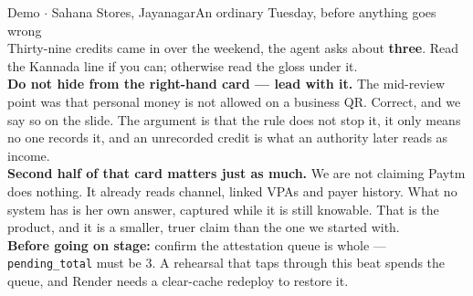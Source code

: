 \documentclass[aspectratio=169,10pt]{beamer}
\begin{document}
\begin{frame}{Demo $\cdot$ Sahana Stores, Jayanagar}{An ordinary Tuesday, before anything goes wrong}
{\\[0.4em]
Thirty-nine credits came in over the weekend, the agent asks about \textbf{three}.
Read the Kannada line if you can; otherwise read the gloss under it.
\\[0.4em]
\textbf{Do not hide from the right-hand card --- lead with it.} The mid-review
point was that personal money is not allowed on a business QR. Correct, and we say
so on the slide. The argument is that the rule does not stop it, it only means no
one records it, and an unrecorded credit is what an authority later reads as income.
\\[0.4em]
\textbf{Second half of that card matters just as much.} We are not claiming Paytm
does nothing. It already reads channel, linked VPAs and payer history. What no
system has is her own answer, captured while it is still knowable. That is the
product, and it is a smaller, truer claim than the one we started with.
\\[0.4em]
\textbf{Before going on stage:} confirm the attestation queue is whole ---
\texttt{pending\_total} must be 3. A rehearsal that taps through this beat spends the
queue, and Render needs a clear-cache redeploy to restore it.}
\end{frame}
\end{document}
